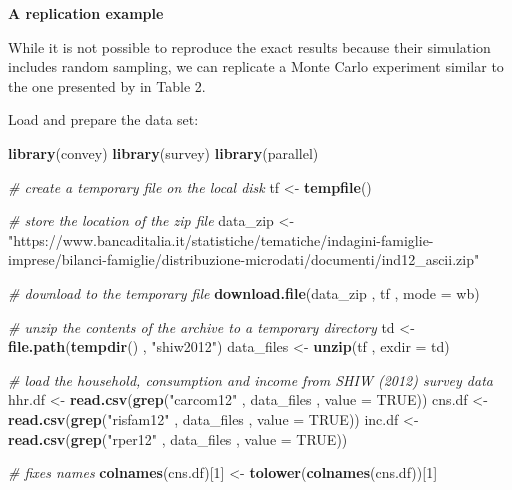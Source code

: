 \documentclass[
]{book}
\newenvironment{Shaded}{\begin{snugshade}}{\end{snugshade}}
\newcommand{\AttributeTok}[1]{\textcolor[rgb]{0.13,0.29,0.53}{#1}}
\newcommand{\CommentTok}[1]{\textcolor[rgb]{0.56,0.35,0.01}{\textit{#1}}}
\newcommand{\ConstantTok}[1]{\textcolor[rgb]{0.56,0.35,0.01}{#1}}
\newcommand{\DecValTok}[1]{\textcolor[rgb]{0.00,0.00,0.81}{#1}}
\newcommand{\FunctionTok}[1]{\textcolor[rgb]{0.13,0.29,0.53}{\textbf{#1}}}
\newcommand{\NormalTok}[1]{#1}
\newcommand{\OtherTok}[1]{\textcolor[rgb]{0.56,0.35,0.01}{#1}}
\newcommand{\StringTok}[1]{\textcolor[rgb]{0.31,0.60,0.02}{#1}}
\begin{document}
\textbf{A replication example}

While it is not possible to reproduce the exact results because their simulation includes random sampling, we can replicate a Monte Carlo experiment similar to the one presented by \textcite{barabesi2016} in Table 2.

Load and prepare the data set:

\begin{Shaded}
\begin{Highlighting}[]
\FunctionTok{library}\NormalTok{(convey)}
\FunctionTok{library}\NormalTok{(survey)}
\FunctionTok{library}\NormalTok{(parallel)}

\CommentTok{\# create a temporary file on the local disk}
\NormalTok{tf }\OtherTok{\textless{}{-}} \FunctionTok{tempfile}\NormalTok{()}

\CommentTok{\# store the location of the zip file}
\NormalTok{data\_zip }\OtherTok{\textless{}{-}}
  \StringTok{"https://www.bancaditalia.it/statistiche/tematiche/indagini{-}famiglie{-}imprese/bilanci{-}famiglie/distribuzione{-}microdati/documenti/ind12\_ascii.zip"}

\CommentTok{\# download to the temporary file}
\FunctionTok{download.file}\NormalTok{(data\_zip , tf , }\AttributeTok{mode =} \StringTok{\textquotesingle{}wb\textquotesingle{}}\NormalTok{)}

\CommentTok{\# unzip the contents of the archive to a temporary directory}
\NormalTok{td }\OtherTok{\textless{}{-}} \FunctionTok{file.path}\NormalTok{(}\FunctionTok{tempdir}\NormalTok{() , }\StringTok{"shiw2012"}\NormalTok{)}
\NormalTok{data\_files }\OtherTok{\textless{}{-}} \FunctionTok{unzip}\NormalTok{(tf , }\AttributeTok{exdir =}\NormalTok{ td)}

\CommentTok{\# load the household, consumption and income from SHIW (2012) survey data}
\NormalTok{hhr.df }\OtherTok{\textless{}{-}} \FunctionTok{read.csv}\NormalTok{(}\FunctionTok{grep}\NormalTok{(}\StringTok{"carcom12"}\NormalTok{ , data\_files , }\AttributeTok{value =} \ConstantTok{TRUE}\NormalTok{))}
\NormalTok{cns.df }\OtherTok{\textless{}{-}} \FunctionTok{read.csv}\NormalTok{(}\FunctionTok{grep}\NormalTok{(}\StringTok{"risfam12"}\NormalTok{ , data\_files , }\AttributeTok{value =} \ConstantTok{TRUE}\NormalTok{))}
\NormalTok{inc.df }\OtherTok{\textless{}{-}} \FunctionTok{read.csv}\NormalTok{(}\FunctionTok{grep}\NormalTok{(}\StringTok{"rper12"}\NormalTok{ , data\_files , }\AttributeTok{value =} \ConstantTok{TRUE}\NormalTok{))}

\CommentTok{\# fixes names}
\FunctionTok{colnames}\NormalTok{(cns.df)[}\DecValTok{1}\NormalTok{] }\OtherTok{\textless{}{-}} \FunctionTok{tolower}\NormalTok{(}\FunctionTok{colnames}\NormalTok{(cns.df))[}\DecValTok{1}\NormalTok{]}


\end{Highlighting}
\end{Shaded}
\end{document}
